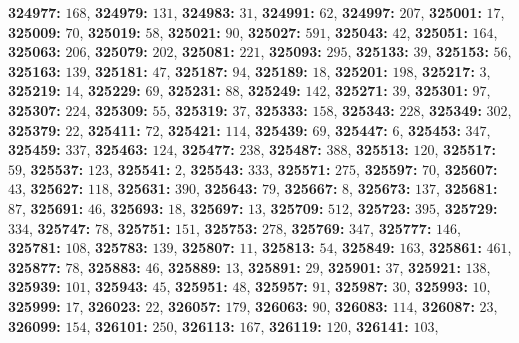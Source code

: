 \textsf{\bfseries 324977:} $168$, \textsf{\bfseries 324979:} $131$, \textsf{\bfseries 324983:} $31$, \textsf{\bfseries 324991:} $62$, \textsf{\bfseries 324997:} $207$, \textsf{\bfseries 325001:} $17$, \textsf{\bfseries 325009:} $70$, \textsf{\bfseries 325019:} $58$, \textsf{\bfseries 325021:} $90$, \textsf{\bfseries 325027:} $591$, \textsf{\bfseries 325043:} $42$, \textsf{\bfseries 325051:} $164$, \textsf{\bfseries 325063:} $206$, \textsf{\bfseries 325079:} $202$, \textsf{\bfseries 325081:} $221$, \textsf{\bfseries 325093:} $295$, \textsf{\bfseries 325133:} $39$, \textsf{\bfseries 325153:} $56$, \textsf{\bfseries 325163:} $139$, \textsf{\bfseries 325181:} $47$, \textsf{\bfseries 325187:} $94$, \textsf{\bfseries 325189:} $18$, \textsf{\bfseries 325201:} $198$, \textsf{\bfseries 325217:} $3$, \textsf{\bfseries 325219:} $14$, \textsf{\bfseries 325229:} $69$, \textsf{\bfseries 325231:} $88$, \textsf{\bfseries 325249:} $142$, \textsf{\bfseries 325271:} $39$, \textsf{\bfseries 325301:} $97$, \textsf{\bfseries 325307:} $224$, \textsf{\bfseries 325309:} $55$, \textsf{\bfseries 325319:} $37$, \textsf{\bfseries 325333:} $158$, \textsf{\bfseries 325343:} $228$, \textsf{\bfseries 325349:} $302$, \textsf{\bfseries 325379:} $22$, \textsf{\bfseries 325411:} $72$, \textsf{\bfseries 325421:} $114$, \textsf{\bfseries 325439:} $69$, \textsf{\bfseries 325447:} $6$, \textsf{\bfseries 325453:} $347$, \textsf{\bfseries 325459:} $337$, \textsf{\bfseries 325463:} $124$, \textsf{\bfseries 325477:} $238$, \textsf{\bfseries 325487:} $388$, \textsf{\bfseries 325513:} $120$, \textsf{\bfseries 325517:} $59$, \textsf{\bfseries 325537:} $123$, \textsf{\bfseries 325541:} $2$, \textsf{\bfseries 325543:} $333$, \textsf{\bfseries 325571:} $275$, \textsf{\bfseries 325597:} $70$, \textsf{\bfseries 325607:} $43$, \textsf{\bfseries 325627:} $118$, \textsf{\bfseries 325631:} $390$, \textsf{\bfseries 325643:} $79$, \textsf{\bfseries 325667:} $8$, \textsf{\bfseries 325673:} $137$, \textsf{\bfseries 325681:} $87$, \textsf{\bfseries 325691:} $46$, \textsf{\bfseries 325693:} $18$, \textsf{\bfseries 325697:} $13$, \textsf{\bfseries 325709:} $512$, \textsf{\bfseries 325723:} $395$, \textsf{\bfseries 325729:} $334$, \textsf{\bfseries 325747:} $78$, \textsf{\bfseries 325751:} $151$, \textsf{\bfseries 325753:} $278$, \textsf{\bfseries 325769:} $347$, \textsf{\bfseries 325777:} $146$, \textsf{\bfseries 325781:} $108$, \textsf{\bfseries 325783:} $139$, \textsf{\bfseries 325807:} $11$, \textsf{\bfseries 325813:} $54$, \textsf{\bfseries 325849:} $163$, \textsf{\bfseries 325861:} $461$, \textsf{\bfseries 325877:} $78$, \textsf{\bfseries 325883:} $46$, \textsf{\bfseries 325889:} $13$, \textsf{\bfseries 325891:} $29$, \textsf{\bfseries 325901:} $37$, \textsf{\bfseries 325921:} $138$, \textsf{\bfseries 325939:} $101$, \textsf{\bfseries 325943:} $45$, \textsf{\bfseries 325951:} $48$, \textsf{\bfseries 325957:} $91$, \textsf{\bfseries 325987:} $30$, \textsf{\bfseries 325993:} $10$, \textsf{\bfseries 325999:} $17$, \textsf{\bfseries 326023:} $22$, \textsf{\bfseries 326057:} $179$, \textsf{\bfseries 326063:} $90$, \textsf{\bfseries 326083:} $114$, \textsf{\bfseries 326087:} $23$, \textsf{\bfseries 326099:} $154$, \textsf{\bfseries 326101:} $250$, \textsf{\bfseries 326113:} $167$, \textsf{\bfseries 326119:} $120$, \textsf{\bfseries 326141:} $103$, 
